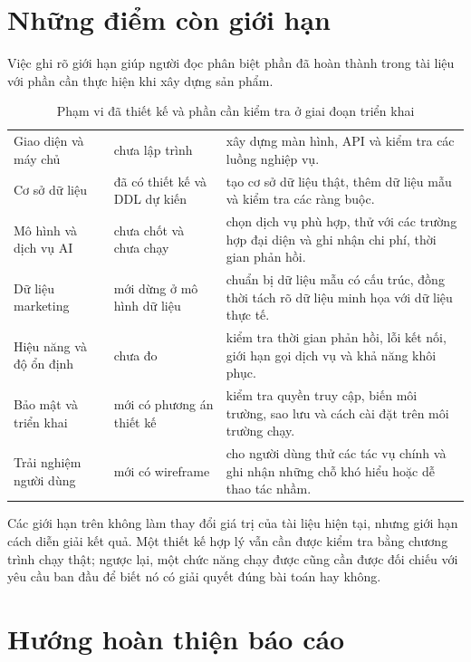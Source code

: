 \section{Những điểm còn giới hạn}

Việc ghi rõ giới hạn giúp người đọc phân biệt phần đã hoàn thành trong tài liệu với phần cần thực hiện khi xây dựng sản phẩm.

\begin{table}[h!]
\centering
\small
\caption{Phạm vi đã thiết kế và phần cần kiểm tra ở giai đoạn triển khai}\label{tab:v8-limitations}
\begin{tabularx}{\textwidth}{|L{4.0cm}|L{3.2cm}|Y|}
\hline
{} &  & \\
\hline
Giao diện và máy chủ & chưa lập trình & xây dựng màn hình, API và kiểm tra các luồng nghiệp vụ.\\
\hline
Cơ sở dữ liệu & đã có thiết kế và DDL dự kiến & tạo cơ sở dữ liệu thật, thêm dữ liệu mẫu và kiểm tra các ràng buộc.\\
\hline
Mô hình và dịch vụ AI & chưa chốt và chưa chạy & chọn dịch vụ phù hợp, thử với các trường hợp đại diện và ghi nhận chi phí, thời gian phản hồi.\\
\hline
Dữ liệu marketing & mới dừng ở mô hình dữ liệu & chuẩn bị dữ liệu mẫu có cấu trúc, đồng thời tách rõ dữ liệu minh họa với dữ liệu thực tế.\\
\hline
Hiệu năng và độ ổn định & chưa đo & kiểm tra thời gian phản hồi, lỗi kết nối, giới hạn gọi dịch vụ và khả năng khôi phục.\\
\hline
Bảo mật và triển khai & mới có phương án thiết kế & kiểm tra quyền truy cập, biến môi trường, sao lưu và cách cài đặt trên môi trường chạy.\\
\hline
Trải nghiệm người dùng & mới có wireframe & cho người dùng thử các tác vụ chính và ghi nhận những chỗ khó hiểu hoặc dễ thao tác nhầm.\\
\hline
\end{tabularx}
\end{table}

Các giới hạn trên không làm thay đổi giá trị của tài liệu hiện tại, nhưng giới hạn cách diễn giải kết quả. Một thiết kế hợp lý vẫn cần được kiểm tra bằng chương trình chạy thật; ngược lại, một chức năng chạy được cũng cần được đối chiếu với yêu cầu ban đầu để biết nó có giải quyết đúng bài toán hay không.

\section{Hướng hoàn thiện báo cáo}

